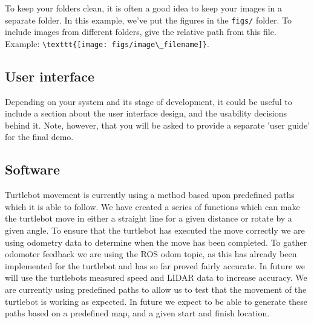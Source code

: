 \documentclass{article}
\begin{document}
To keep your folders clean, it is often a good idea to keep your images in a separate folder. In this example, we've put the figures in the \texttt{figs/} folder. To include images from different folders, give the relative path from this file. Example: \verb+\texttt{[image: figs/image\_filename]}+.


\subsection{User interface}

Depending on your system and its stage of development, it could be useful to include a section about the user interface design, and the usability decisions behind it. Note, however, that you will be asked to provide a separate 'user guide' for the final demo.

\subsection{Software}



Turtlebot movement is currently using a method based upon predefined paths which it is able to follow.
We have created a series of functions which can make the turtlebot move in either a straight line for a given distance or rotate by a given angle.
To ensure that the turtlebot has executed the move correctly we are using odometry data to determine when the move has been completed. 
To gather odomoter feedback we are using the ROS odom topic, as this has already been implemented for the turtlebot and has so far proved fairly accurate.
In future we will use the turtlebots measured speed and LIDAR data to increase accuracy.
We are currently using predefined paths to allow us to test that the movement of the turtlebot is working as expected. In future we expect to be able to generate these paths based on a predefined map, and a given start and finish location.
\end{document}
